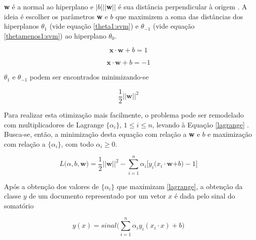 \textbf{w} é a normal ao hiperplano e \ensuremath{|b|||}\textbf{w}\ensuremath{||} é sua distância perpendicular à origem \cite{mono-puc}. A ideia é escolher os parâmetros \textbf{w} e \ensuremath{b} que maximizem a soma das distâncias dos hiperplanos \ensuremath{\theta_1} (vide equação \ref{theta1:svm}) e \ensuremath{\theta_{-1}} (vide equação \ref{thetamenos1:svm}) ao hiperplano \ensuremath{\theta_0}. 

\begin{equation}
\label{theta1:svm}
\textbf{x} \ensuremath{\cdot} \textbf{w} + \ensuremath{b} = 1
\end{equation}

\begin{equation}
\label{thetamenos1:svm}
\textbf{x} \ensuremath{\cdot} \textbf{w} + \ensuremath{b} = -1
\end{equation}

\ensuremath{\theta_1} e \ensuremath{\theta_{-1}} podem ser encontrados minimizando-se 

\begin{equation}
\label{optim:svm}
\ensuremath{\frac{1}{2}||}\textbf{w}\ensuremath{||^2}
\end{equation}

Para realizar esta otimização mais facilmente, o problema pode ser remodelado com multiplicadores de Lagrange \ensuremath{\{\alpha_i\}}, \ensuremath{1 \leq i \leq n}, levando à Equação \ref{lagrange} \cite{mono-puc}. Busca-se, então, a minimização desta equação com relação a \textbf{w} e \ensuremath{b} e maximização com relação a \ensuremath{\{\alpha_i\}}, com todo \ensuremath{\alpha_i \geq 0}.

\begin{equation}
\label{lagrange}
\ensuremath{L(\alpha, b,}\textbf{w}\ensuremath{) = \frac{1}{2} ||}\textbf{w}\ensuremath{||^2 - \sum_{i = 1}^n \alpha_i\big[y_i(x_i \cdot}\textbf{w}\ensuremath{+ b) -1 \big]} %
\end{equation}

Após a obtenção dos valores de \ensuremath{\{\alpha_i\}} que maximizam \ref{lagrange}, a obtenção da classe \ensuremath{y} de um documento representado por um vetor \ensuremath{x} é dada pelo sinal do somatório

\begin{equation}
\label{result:svm}
\ensuremath{y(x) = sinal\bigg(\sum_{i = 1}^n \alpha_iy_i(x_i \cdot x) + b\bigg)} %
\end{equation}

